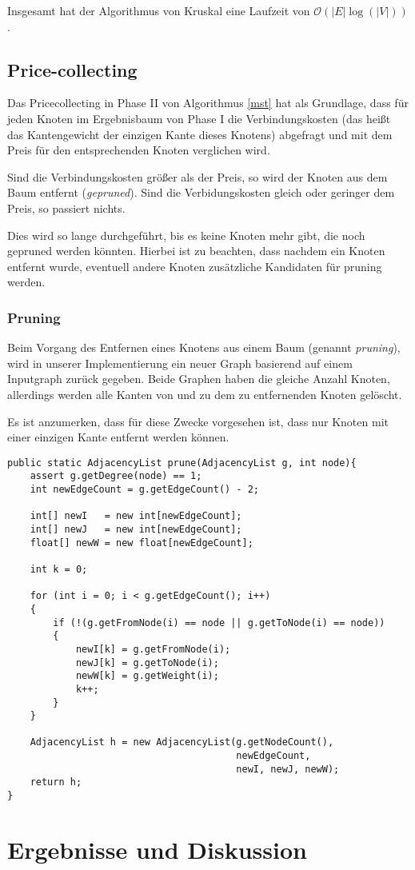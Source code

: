 \documentclass[a4paper,10pt]{article}
\begin{document}
Insgesamt hat der Algorithmus von Kruskal eine Laufzeit von $\mathcal{O}(|E|\log(|V|))$.

\subsection{Price-collecting}

Das Pricecollecting in Phase II von Algorithmus \ref{mst} hat als Grundlage, dass für jeden Knoten im Ergebnisbaum von Phase I die Verbindungskosten (das heißt das Kantengewicht der einzigen Kante dieses Knotens) abgefragt und mit dem Preis für den entsprechenden Knoten verglichen wird.

Sind die Verbindungskosten größer als der Preis, so wird der Knoten aus dem Baum entfernt (\emph{gepruned}). Sind die Verbidungskosten gleich oder geringer dem Preis, so passiert nichts.

Dies wird so lange durchgeführt, bis es keine Knoten mehr gibt, die noch gepruned werden könnten. Hierbei ist zu beachten, dass nachdem ein Knoten entfernt wurde, eventuell andere Knoten zusätzliche Kandidaten für pruning werden.

\subsubsection{Pruning}

Beim Vorgang des Entfernen eines Knotens aus einem Baum (genannt \emph{pruning}), wird in unserer Implementierung ein neuer Graph basierend auf einem Inputgraph zurück gegeben. Beide Graphen haben die gleiche Anzahl Knoten, allerdings werden alle Kanten von und zu dem zu entfernenden Knoten gelöscht.
\smallskip

Es ist anzumerken, dass für diese Zwecke vorgesehen ist, dass nur Knoten mit einer einzigen Kante entfernt werden können.
\bigskip

\begin{lstlisting}
public static AdjacencyList prune(AdjacencyList g, int node){
    assert g.getDegree(node) == 1;
    int newEdgeCount = g.getEdgeCount() - 2;
       
    int[] newI   = new int[newEdgeCount];
    int[] newJ   = new int[newEdgeCount];
    float[] newW = new float[newEdgeCount];
        
    int k = 0;
        
    for (int i = 0; i < g.getEdgeCount(); i++)
    {
        if (!(g.getFromNode(i) == node || g.getToNode(i) == node))
        {
            newI[k] = g.getFromNode(i);
            newJ[k] = g.getToNode(i);
            newW[k] = g.getWeight(i);
            k++;
        }
    }
       
    AdjacencyList h = new AdjacencyList(g.getNodeCount(), 
                                        newEdgeCount,
                                        newI, newJ, newW);
    return h;
}
\end{lstlisting}

\section{Ergebnisse und Diskussion}



\end{document}
